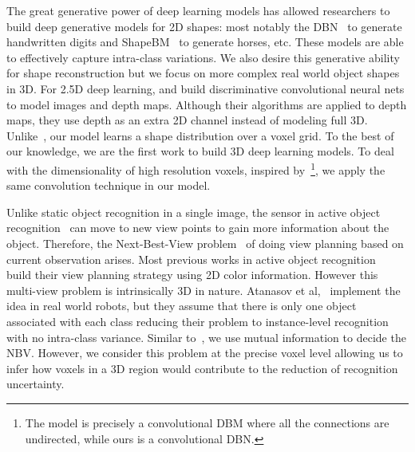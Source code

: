 \documentclass[10pt,twocolumn,letterpaper]{article}
\begin{document}
The great generative power of deep learning models has allowed researchers to build deep generative models for 2D shapes: most notably the DBN~\cite{DBN} to generate handwritten digits and ShapeBM~\cite{ShapeBM2012} to generate horses, etc. These models are able to effectively capture intra-class variations. We also desire this generative ability for shape reconstruction but we focus on more complex real world object shapes in 3D. 
For 2.5D deep learning, \cite{Socher} and \cite{depthRCNN} build discriminative convolutional neural nets to model images and depth maps. 
Although their algorithms are applied to depth maps, they use depth as
an extra 2D channel instead of modeling full 3D. 
Unlike~\cite{Socher}, our model learns a shape distribution over a voxel grid. To the best of our knowledge, we are the first work to build 3D deep learning models.
To deal with the dimensionality of high resolution voxels, inspired by~\cite{CDBN}\footnote{The model is precisely a convolutional DBM where all the connections are undirected, while ours is a convolutional DBN.}, we apply the same convolution technique in our model.












Unlike static object recognition in a single image, the sensor in active object recognition~\cite{callari2001active} can move to new view points to gain more information about the object. Therefore, the Next-Best-View problem~\cite{NBVsurveys} of doing view planning based on current observation arises. 
Most previous works in active object recognition~\cite{denzler2002information,jia2009active} 
build their view planning strategy using 2D color information. However this multi-view problem is intrinsically 3D in nature.
Atanasov et al,~\cite{atanasov2013hypothesis,atanasov2013nonmyopic} implement the idea in real world robots, but they assume that there is only one object associated with each class reducing their problem to instance-level recognition with no intra-class variance. 
 Similar to~\cite{denzler2002information},  we use mutual information to decide the NBV. However, we consider this problem at the precise voxel level allowing us to infer how voxels in a 3D region would contribute to the reduction of recognition uncertainty.
 
 
 
 
\end{document}
